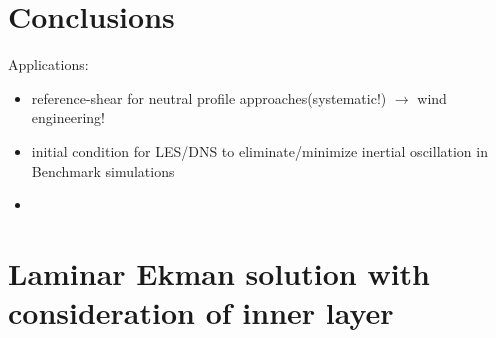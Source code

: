 \documentclass[a4paper,11pt]{amsart}
\begin{document}
\section{Conclusions}
%
Applications:
\begin{itemize}
\item reference-shear for neutral profile approaches(systematic!) $\rightarrow$ wind engineering! 
\item initial condition for LES/DNS to eliminate/minimize inertial oscillation in Benchmark simulations
\item
\end{itemize} 

\appendix

\section{Laminar Ekman solution with consideration of inner layer}
\end{document}
